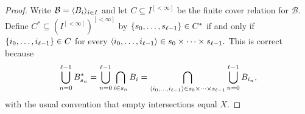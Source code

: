 \documentclass[csc]{subfiles}
\begin{document}
\begin{proof}
  Write \(\mathcal{B} = \langle B_i\rangle_{i \in I}\) and let \(C \subseteq I^{[<\infty]}\) be the finite cover relation for \(\mathcal{B}.\)
  Define \(C^* \subseteq (I^{[<\infty]})^{[<\infty]}\) by \(\lbrace s_0,\dots,s_{\ell-1}\rbrace \in C^*\) if and only if \(\lbrace i_0,\dots,i_{\ell-1}\rbrace \in C\) for every \(\langle i_0,\dots,i_{\ell-1}\rangle \in s_0 \times\cdots\times s_{\ell-1}.\)
  This is correct because \[\bigcup_{n=0}^{\ell-1} B^*_{s_n} = \bigcup_{n=0}^{\ell-1} \bigcap_{i \in s_n} B_i = \bigcap_{\langle i_0,\dots,i_{\ell-1}\rangle \in s_0\times\cdots\times s_{\ell-1}} \bigcup_{n=0}^{\ell-1} B_{i_n},\] with the usual convention that empty intersections equal \(X.\)
\end{proof}
\end{document}
